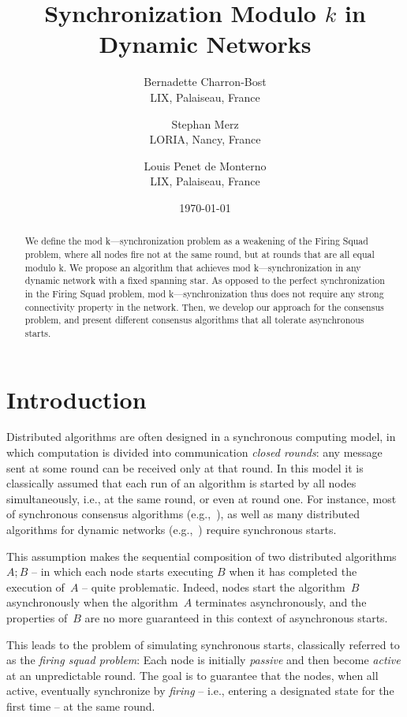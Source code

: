 \documentclass[11pt,letterpaper]{article}
\title{Synchronization Modulo $k$ in Dynamic Networks}
\author{
	Bernadette Charron-Bost \\
	LIX, Palaiseau, France
\and
	Stephan Merz \\
	LORIA, Nancy, France
\and
	Louis Penet de Monterno \\
	LIX, Palaiseau, France
}
\date{\today}
\begin{document}
\maketitle
\tableofcontents

\begin{abstract}
	We define the mod k—synchronization problem as a weakening of the Firing Squad problem,
	where all nodes fire not at the same round, but at rounds that are all equal modulo k.
	We propose an algorithm that achieves mod k—synchronization  in any dynamic network
	with a fixed spanning star. As opposed to the perfect synchronization in
	the Firing Squad problem, mod k—synchronization thus does not require
	any strong connectivity property in the network. 
	Then, we develop our approach for the consensus problem,
	and present different consensus algorithms that all tolerate asynchronous starts.
\end{abstract}

\section{Introduction}

Distributed algorithms are often designed in a synchronous computing model, in which computation
	is divided into communication {\em closed rounds}:
	any message  sent at some round  can be received only at that round.
In this model it is classically assumed that each run of an algorithm is started by all nodes simultaneously, i.e., at the same round,
	or even at round one.
For instance, most of synchronous consensus algorithms
	(e.g.,~\cite{PSL80,DS83,ST87}), as well as many distributed algorithms for dynamic networks (e.g.,~\cite{KLO10,KMO11})
	require synchronous starts.

This assumption makes the sequential composition of two distributed algorithms $A;B$
	-- in which each node starts executing $B$ when it has completed the execution of~$A$ --
	quite problematic.
Indeed, nodes start the algorithm~$B$ asynchronously when the algorithm~$A$ terminates asynchronously,
	and the properties of~$B$ are no more guaranteed in this context of asynchronous starts.

This leads to the problem of simulating synchronous starts, classically referred to as
	the {\em firing squad problem}:
Each node is  initially  {\em passive} and then become {\em active}  at an unpredictable round.
The goal is to guarantee that   the nodes, when all active, eventually synchronize
	by {\em firing} -- i.e., entering a designated state for the first time -- at the same round.
\end{document}
